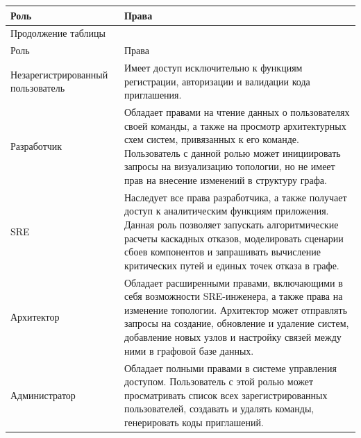 \begin{center}
    \begin{tabularx}{\textwidth}{|X|X|}
        \caption{\label{tbl:roles-desc}Описание ролей системы} \\ \hline
        Роль & Права \\ \hline
        \endfirsthead

        \multicolumn{2}{l}{{Продолжение таблицы\ \thetable{}}} \\ \hline
        Роль & Права \\ \hline
        \endhead

        \hline
        \endfoot
        \endlastfoot

        Незарегистрированный \newline пользователь & Имеет доступ исключительно к функциям
        регистрации, авторизации и валидации кода приглашения. \\ \hline
        
        Разработчик & Обладает правами на чтение данных о пользователях своей
        команды, а также на просмотр архитектурных схем систем, привязанных к его
        команде. Пользователь с данной ролью может инициировать запросы на визуализацию
        топологии, но не имеет прав на внесение изменений в структуру графа. \\ \hline

        SRE & Наследует все права разработчика, а также получает доступ к
        аналитическим функциям приложения. Данная роль позволяет запускать
        алгоритмические расчеты каскадных отказов, моделировать сценарии сбоев
        компонентов и запрашивать вычисление критических путей и единых точек отказа в графе. \\ \hline

        Архитектор & Обладает расширенными правами, включающими в себя возможности
        SRE-инженера, а также права на изменение топологии. Архитектор может отправлять
        запросы на создание, обновление и удаление систем, добавление новых узлов и
        настройку связей между ними в графовой базе данных. \\ \hline

        Администратор & Обладает полными правами в системе управления доступом.
        Пользователь с этой ролью может просматривать список всех зарегистрированных
        пользователей, создавать и удалять команды, генерировать коды приглашений. \\ \hline
    \end{tabularx}
\end{center}

